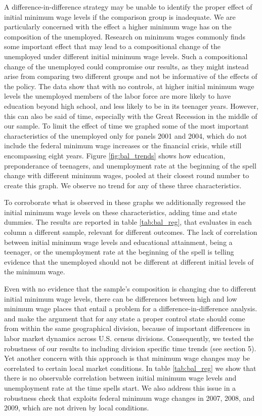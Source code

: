 \documentclass{article}
\begin{document}
A difference-in-difference strategy may be unable to identify the proper effect of initial minimum wage levels if the comparison group is inadequate. We are particularly concerned with the effect a higher minimum wage has on the composition of the unemployed. Research on minimum wages commonly finds some important effect that may lead to a compositional change of the unemployed under different initial minimum wage levels. Such a compositional change of the unemployed could compromise our results, as they might instead arise from comparing two different groups and not be informative of the effects of the policy. The data show that with no controls, at higher initial minimum wage levels the unemployed members of the labor force are more likely to have education beyond high school, and less likely to be in its teenager years. However, this can also be said of time, especially with the Great Recession in the middle of our sample. To limit the effect of time we graphed some of the most important characteristics of the unemployed only for panels 2001 and 2004, which do not include the federal minimum wage increases or the financial crisis, while still encompassing eight years. Figure \ref{fig:bal_trends} shows how education, preponderance of teenagers, and unemployment rate at the beginning of the spell change with different minimum wages, pooled at their closest round number to create this graph. We observe no trend for any of these three characteristics. 

To corroborate what is observed in these graphs we additionally regressed the initial minimum wage levels on these characteristics, adding time and state dummies. The results are reported in table \ref{tab:bal_reg}, that evaluates in each column a different sample, relevant for different outcomes. The lack of correlation between initial minimum wage levels and educational attainment, being a teenager, or the unemployment rate at the beginning of the spell is telling evidence that the unemployed should not be different at different initial levels of the minimum wage.

Even with no evidence that the sample's composition is changing due to different initial minimum wage levels, there can be differences between high and low minimum wage places that entail a problem for a difference-in-difference analysis. \cite{allegretto2011minimum} and \cite{dube2010minimum} make the argument that for any state a proper control state should come from within the same geographical division, because of important differences in labor market dynamics across U.S. census divisions. Consequently, we tested the robustness of our results to including division specific time trends (see section 5). Yet another concern with this approach is that minimum wage changes may be correlated to certain local market conditions. In table \ref{tab:bal_reg} we show that there is no observable correlation between initial minimum wage levels and unemployment rate at the time spells start. We also address this issue in a robustness check that exploits federal minimum wage changes in 2007, 2008, and 2009, which are not driven by local conditions. 
\end{document}
